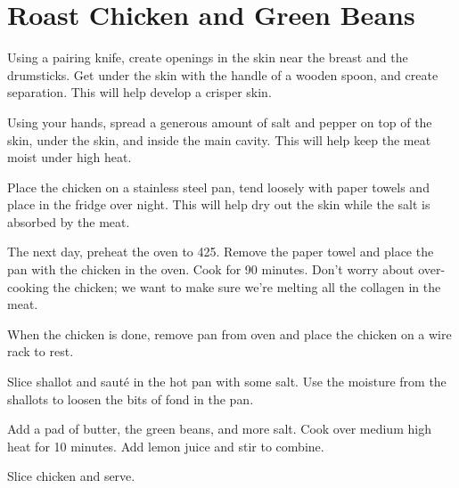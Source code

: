 \section{Roast Chicken and Green Beans}
\begin{recipe}



Using a pairing knife, create openings in the skin near the breast and the drumsticks. Get under the skin with the handle of a wooden spoon, and create separation. This will help develop a crisper skin.

Using your hands, spread a generous amount of salt and pepper on top of the skin, under the skin, and inside the main cavity. This will help keep the meat moist under high heat.

Place the chicken on a stainless steel pan, tend loosely with paper towels and place in the fridge over night. This will help dry out the skin while the salt is absorbed by the meat.

The next day, preheat the oven to 425. Remove the paper towel and place the pan with the chicken in the oven. Cook for 90 minutes. Don't worry about over-cooking the chicken; we want to make sure we're melting all the collagen in the meat.


When the chicken is done, remove pan from oven and place the chicken on a wire rack to rest.

Slice shallot and sauté in the hot pan with some salt. Use the moisture from the shallots to loosen the bits of fond in the pan.

Add a pad of butter, the green beans, and more salt. Cook over medium high heat for 10 minutes. Add lemon juice and stir to combine.

Slice chicken and serve.

\end{recipe}
